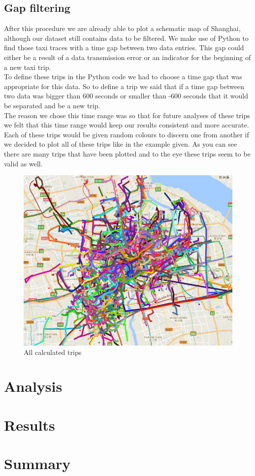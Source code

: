 \documentclass[11pt,conference,a4paper,onecolumn,romanappendices]{IEEEtran}
\begin{document}
\subsection{Gap filtering}
After this procedure we are already able to plot a schematic map of Shanghai, although our dataset still contains data to be filtered. We make use of Python to find those taxi traces with a time gap between two data entries. This gap could either be a result of a data transmission error or an indicator for the beginning of a new taxi trip.\\
To define these trips in the Python code we had to choose a time gap that was appropriate for this data. So to define a trip we said that if a time gap between two data was bigger than 600 seconds or smaller than -600 seconds that it would be separated and be a new trip.\\
The reason we chose this time range was so that for future analyses of these trips we felt that this time range would keep our results consistent and more accurate. Each of these trips would be given random colours to discern one from another if we decided to plot all of these trips like in the example given. As you can see there are many trips that have been plotted and to the eye these trips seem to be valid as well. \\
\begin{figure}
\centering
\includegraphics[scale=0.35]{plotalltrips.png}
\caption{\label{fig:plotalltrips}All calculated trips}
\end{figure}
\section{Analysis}
\section{Results}
\section{Summary}

\newpage


\end{document}
